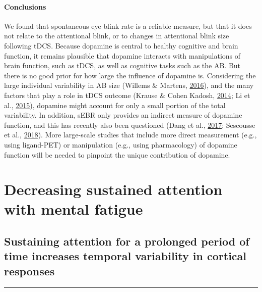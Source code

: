 \documentclass[11pt,]{memoir}
\begin{document}
\hypertarget{conclusions}{%
\subsection{Conclusions}\label{conclusions}}

We found that spontaneous eye blink rate is a reliable measure, but that it does not relate to the attentional blink, or to changes in attentional blink size following tDCS. Because dopamine is central to healthy cognitive and brain function, it remains plausible that dopamine interacts with manipulations of brain function, such as tDCS, as well as cognitive tasks such as the AB. But there is no good prior for how large the influence of dopamine is. Considering the large individual variability in AB size (Willems \& Martens, \protect\hyperlink{ref-Willems2016}{2016}), and the many factors that play a role in tDCS outcome (Krause \& Cohen Kadosh, \protect\hyperlink{ref-Krause2014}{2014}; Li et al., \protect\hyperlink{ref-Li2015b}{2015}), dopamine might account for only a small portion of the total variability. In addition, sEBR only provides an indirect measure of dopamine function, and this has recently also been questioned (Dang et al., \protect\hyperlink{ref-Dang2017}{2017}; Sescousse et al., \protect\hyperlink{ref-Sescousse2018}{2018}). More large-scale studies that include more direct measurement (e.g., using ligand-PET) or manipulation (e.g., using pharmacology) of dopamine function will be needed to pinpoint the unique contribution of dopamine.

\hypertarget{part-MF}{%
\part{Decreasing sustained attention with mental fatigue}\label{part-MF}}

\hypertarget{MFBrain}{%
\chapter{Sustaining attention for a prolonged period of time increases temporal variability in cortical responses}\label{MFBrain}}


\vspace*{\fill}

\begin{center}\rule{0.5\linewidth}{\linethickness}\end{center}
\end{document}
